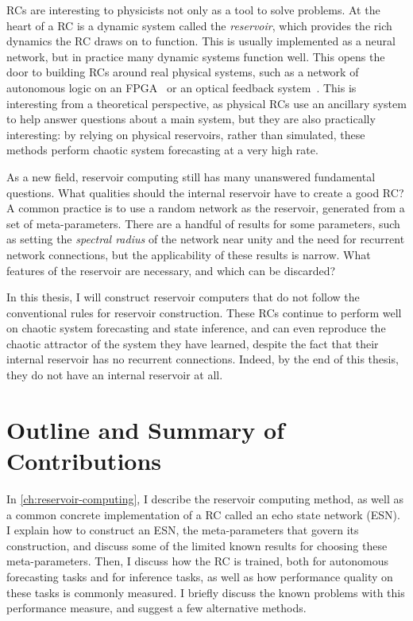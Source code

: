 RCs are interesting to physicists not only as a tool to solve
problems. At the heart of a RC is a dynamic system called the
\emph{reservoir}, which provides the rich dynamics the RC draws on to
function. This is usually implemented as a neural network, but in
practice many dynamic systems function well. This opens the door to
building RCs around real physical systems, such as a network of
autonomous logic on an FPGA~\cite{canaday2018} or an optical feedback
system~\cite{antonik2016}. This is interesting from a theoretical
perspective, as physical RCs use an ancillary system to help answer
questions about a main system, but they are also practically
interesting: by relying on physical reservoirs, rather than simulated,
these methods perform chaotic system forecasting at a very high rate.

As a new field, reservoir computing still has many unanswered
fundamental questions. What qualities should the internal reservoir
have to create a good RC? A common practice is to use a random network
as the reservoir, generated from a set of meta-parameters. There are a
handful of results for some parameters, such as setting the
\emph{spectral radius} of the network near unity and the need for
recurrent network connections,\cite{jaeger2001,lukosevicius2012} but
the applicability of these results is narrow. What features of the
reservoir are necessary, and which can be discarded?

In this thesis, I will construct reservoir computers that do not
follow the conventional rules for reservoir construction. These RCs
continue to perform well on chaotic system forecasting and state
inference, and can even reproduce the chaotic attractor of the system
they have learned, despite the fact that their internal reservoir has
no recurrent connections. Indeed, by the end of this thesis, they do
not have an internal reservoir at all.

\section{Outline and Summary of Contributions}


In \cref{ch:reservoir-computing}, I describe the reservoir computing
method, as well as a common concrete implementation of a RC called an
echo state network (ESN). I explain how to construct an ESN, the
meta-parameters that govern its construction, and discuss some of the
limited known results for choosing these meta-parameters. Then, I
discuss how the RC is trained, both for autonomous forecasting tasks
and for inference tasks, as well as how performance quality on these
tasks is commonly measured. I briefly discuss the known problems with
this performance measure, and suggest a few alternative methods.

